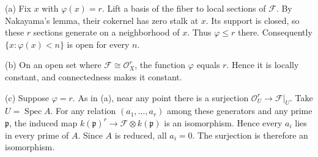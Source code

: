 (a) Fix $x$ with $\varphi(x)=r$. Lift a basis of the fiber to local sections of $\mathcal F$. By Nakayama's lemma, their cokernel has zero stalk at $x$. Its support is closed, so these $r$ sections generate on a neighborhood of $x$. Thus $\varphi\le r$ there. Consequently $\{x:\varphi(x)<n\}$ is open for every $n$.

(b) On an open set where $\mathcal F\cong\mathcal O_X^r$, the function $\varphi$ equals $r$. Hence it is locally constant, and connectedness makes it constant.

(c) Suppose $\varphi=r$. As in (a), near any point there is a surjection $\mathcal O_U^r\to\mathcal F|_U$. Take $U=\operatorname{Spec}A$. For any relation $(a_1,\ldots,a_r)$ among these generators and any prime $\mathfrak p$, the induced map $k(\mathfrak p)^r\to\mathcal F\otimes k(\mathfrak p)$ is an isomorphism. Hence every $a_i$ lies in every prime of $A$. Since $A$ is reduced, all $a_i=0$. The surjection is therefore an isomorphism.
